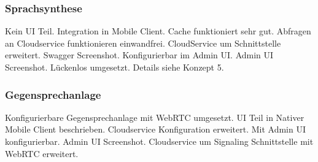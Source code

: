 \clearpage

\subsubsection{Sprachsynthese}

Kein UI Teil.
Integration in Mobile Client.
Cache funktioniert sehr gut.
Abfragen an Cloudservice funktionieren einwandfrei.
CloudService um Schnittstelle erweitert.
Swagger Screenshot.
Konfigurierbar im Admin UI.
Admin UI Screenshot.
Lückenlos umgesetzt.
Details siehe Konzept 5.

\clearpage

\subsubsection{Gegensprechanlage}

Konfigurierbare Gegensprechanlage mit WebRTC umgesetzt.
UI Teil in Nativer Mobile Client beschrieben.
Cloudservice Konfiguration erweitert.
Mit Admin UI konfigurierbar.
Admin UI Screenshot.
Cloudservice um Signaling Schnittstelle mit WebRTC erweitert.

